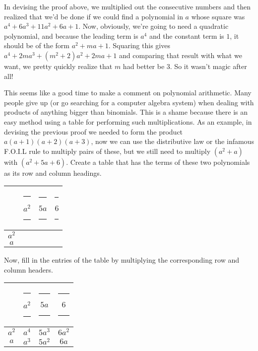 In devising the proof above, we multiplied out the consecutive numbers 
and then realized that we'd be done if we could find a polynomial in 
$a$ whose square was $a^4  + 6a^3 + 11a^2 + 6a + 1$.  Now, obviously, 
we're going to need a quadratic polynomial, and because the leading 
term is $a^4$ and the constant term is $1$, it should be of the form 
$a^2 + ma + 1$.  Squaring this gives $a^4 + 2ma^3 + (m^2+2)a^2 + 2ma + 1$ 
and comparing that result with what we want, we pretty quickly realize 
that $m$ had better be 3.  So it wasn't magic after all!

This seems like a good time to make a comment on polynomial arithmetic.
Many people give up (or go searching for a computer algebra system) 
when dealing with products of anything bigger than binomials.  This 
is a shame because there is an easy method using a table for performing 
such multiplications.  As an example, in devising the previous proof we 
needed to form the product $a(a+1)(a+2)(a+3)$, now we can use the
distributive law or the infamous F.O.I.L rule to multiply pairs of these, 
but we still need to multiply $(a^2+a)$ with $(a^2+5a+6)$.  Create a 
table that has the terms of these two polynomials as its row and column 
headings.

\begin{center}
\begin{tabular}{c|ccc}
      & \rule{3pt}{0pt} $a^2$ \rule{3pt}{0pt}  & \rule{3pt}{0pt}  $5a$ \rule{3pt}{0pt}  & \rule{3pt}{0pt}  $6$  \rule{3pt}{0pt} \\ \hline
$a^2$ &         &      & \\
$a$   &         &      & \\
\end{tabular}
\end{center}

Now, fill in the entries of the table by multiplying the corresponding 
row and column headers.

\begin{center}
\begin{tabular}{c|ccc}
      &  \rule{3pt}{0pt}   $a^2$ \rule{3pt}{0pt}  & \rule{3pt}{0pt}  $5a$  \rule{3pt}{0pt}   &  \rule{3pt}{0pt} $6$  \rule{3pt}{0pt} \\ \hline
$a^2$ &   $a^4$ & $5a^3$ & $6a^2$ \\
$a$   &   $a^3$ & $5a^2$ & $6a$ \\
\end{tabular}
\end{center}

